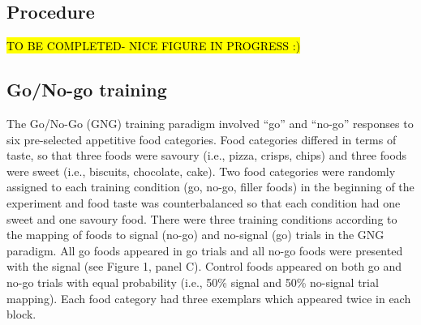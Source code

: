 \documentclass[man,floatsintext]{apa6}
\begin{document}
\subsection{Procedure}\label{procedure}

\hl{TO BE COMPLETED- NICE FIGURE IN PROGRESS :)}

\subsection{Go/No-go training}\label{gng}

\par

The Go/No-Go (GNG) training paradigm involved \enquote{go} and
\enquote{no-go} responses to six pre-selected appetitive food
categories. Food categories differed in terms of taste, so that three
foods were savoury (i.e., pizza, crisps, chips) and three foods were
sweet (i.e., biscuits, chocolate, cake). Two food categories were
randomly assigned to each training condition (go, no-go, filler foods)
in the beginning of the experiment and food taste was counterbalanced so
that each condition had one sweet and one savoury food. There were three
training conditions according to the mapping of foods to signal (no-go)
and no-signal (go) trials in the GNG paradigm. All go foods appeared in
go trials and all no-go foods were presented with the signal (see Figure
1, panel C). Control foods appeared on both go and no-go trials with
equal probability (i.e., 50\% signal and 50\% no-signal trial mapping).
Each food category had three exemplars which appeared twice in each
block.

\par
\end{document}
